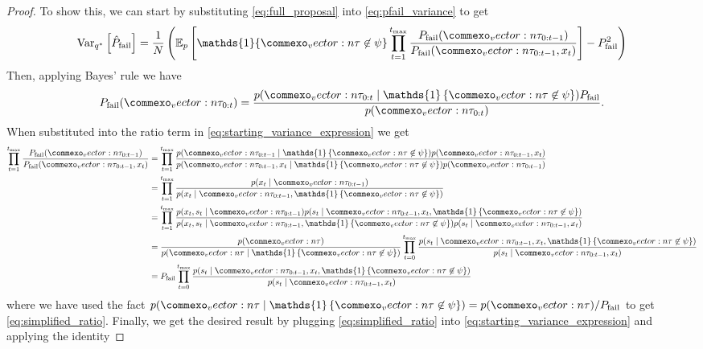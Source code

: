\begin{proof}
To show this, we can start by substituting \cref{eq:full_proposal} into \cref{eq:pfail_variance} to get
\begin{equation}
    \text{Var}_{q^*}\left[ \hat{P}_{\rm fail} \right] = \frac{1}{N} \left(\mathbb{E}_p \left[\mathds{1}\{ \vec{\tau} \not \in \psi \} \prod_{t=1}^{t_{\rm max}} \frac{P_{\rm fail}(\vec{\tau}_{0:t-1})}{P_{\rm fail}(\vec{\tau}_{0:t-1}, x_t)} \right] - P_{\rm fail}^2 \right) \label{eq:starting_variance_expression}
\end{equation}
Then, applying Bayes' rule we have 
\begin{equation}
    P_{\rm fail}(\vec{\tau}_{0:t}) = \frac{p(\vec{\tau}_{0:t} \mid \mathds{1} \left\{ \vec{\tau} \not \in \psi \right\}) P_{\rm fail}}{p(\vec{\tau}_{0:t})} \text{.}
\end{equation}
When substituted into the ratio term in \cref{eq:starting_variance_expression} we get
\begin{align}
    \prod_{t=1}^{t_{\rm max}} \frac{P_{\rm fail}(\vec{\tau}_{0:t-1})}{P_{\rm fail}(\vec{\tau}_{0:t-1}, x_t)} &= \prod_{t=1}^{t_{\rm max}} \frac{p(\vec{\tau}_{0:t-1} \mid \mathds{1} \left\{ \vec{\tau} \not \in \psi \right\}) p(\vec{\tau}_{0:t-1}, x_t)}{p(\vec{\tau}_{0:t-1}, x_t \mid \mathds{1} \left\{ \vec{\tau} \not \in \psi \right\}) p(\vec{\tau}_{0:t-1})} \\
    &= \prod_{t=1}^{t_{\rm max}} \frac{p(x_t \mid \vec{\tau}_{0:t-1})}{p(x_t \mid \vec{\tau}_{0:t-1}, \mathds{1} \left\{ \vec{\tau} \not \in \psi \right\})} \\
    &= \prod_{t=1}^{t_{\rm max}} \frac{p(x_t, s_t \mid \vec{\tau}_{0:t-1})p(s_t \mid \vec{\tau}_{0:t-1}, x_t, \mathds{1} \left\{ \vec{\tau} \not \in \psi \right\})}{p(x_t, s_t \mid \vec{\tau}_{0:t-1}, \mathds{1} \left\{ \vec{\tau} \not \in \psi \right\})p(s_t \mid \vec{\tau}_{0:t-1}, x_t)} \\
    &= \frac{p(\vec{\tau})}{p(\vec{\tau} \mid \mathds{1} \left\{ \vec{\tau} \not \in \psi \right\})} \prod_{t=0}^{t_{\rm max}} \frac{p(s_t \mid \vec{\tau}_{0:t-1}, x_t, \mathds{1} \left\{ \vec{\tau} \not \in \psi \right\})}{p(s_t \mid \vec{\tau}_{0:t-1}, x_t)} \\
    &= P_{\rm fail}\prod_{t=0}^{t_{\rm max}} \frac{p(s_t \mid \vec{\tau}_{0:t-1}, x_t, \mathds{1} \left\{ \vec{\tau} \not \in \psi \right\})}{p(s_t \mid \vec{\tau}_{0:t-1}, x_t)} \label{eq:simplified_ratio}
\end{align}
where we have used the fact $p(\vec{\tau} \mid \mathds{1} \left\{ \vec{\tau} \not \in \psi \right\}) =  p (\vec{\tau})/P_{\rm fail}$ to get \cref{eq:simplified_ratio}. Finally, we get the desired result by plugging \cref{eq:simplified_ratio} into \cref{eq:starting_variance_expression} and applying the identity

\end{proof}
